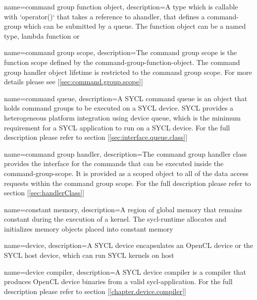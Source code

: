 {
  name={command group function object},
  description={A type which is callable with `operator()` that takes a reference
  to a\gls{handler}, that defines a \gls{command-group} which can be submitted
  by a \gls{queue}. The function object can be a named type, lambda function or
  }
}

{
  name={command group scope},
  description={The command group scope is the function scope defined by the
               \gls{command-group-function-object}. The command group \gls{handler} object lifetime
               is restricted to the command group scope. For more details
               please see [\ref{sec:command.group.scope}]}
}

{
  name={command queue},
  description={A SYCL command queue is an object that holds command
                groups to be executed on a SYCL \gls{device}. SYCL provides a
                heterogeneous platform integration using device queue, which is
                the minimum requirement for a SYCL application to run on a
                SYCL \gls{device}. For the full description please refer to
            section [\ref{sec:interface.queue.class}]}
}

{
  name={command group handler},
  description={The command group handler class provides the interface for the
               commands that can be executed inside the
               \gls{command-group-scope}. It is provided as a scoped object
               to all of the data access requests within the command group scope.
               For the full description please refer to section
         [\ref{sec:handlerClass}]}
}

{
  name={constant memory},
  description={A region of global memory that remains constant during the
               execution of a kernel. The \gls{sycl-runtime}
               allocates and initializes memory objects placed into constant
               memory}
}

{
  name=device,
  description={A SYCL device encapsulates an OpenCL device or the SYCL
               host device, which can run SYCL kernels on host}
}

{
  name={device compiler},
  description={A SYCL device compiler is a compiler that produces OpenCL
               \gls{device} binaries from a valid \gls{sycl-application}.
               For the full description please refer to section
         [\ref{chapter.device.compiler}]}
}

